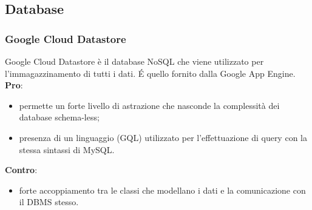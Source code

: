 	\subsection{Database} %
	\label{sub:database}

		\subsubsection{Google Cloud Datastore} %
		\label{ssub:datastore}
		Google Cloud Datastore è il database NoSQL che viene utilizzato per l'immagazzinamento di tutti i dati. \'E quello fornito dalla Google App Engine. \newline
		\textbf{Pro}:
			\begin{itemize}
				\item permette un forte livello di astrazione che nasconde la complessità dei database schema-less;
				\item presenza di un linguaggio (GQL) utilizzato per l'effettuazione di query con la stessa sintassi di MySQL.
			\end{itemize}
			\noindent
			\textbf{Contro}:
				\begin{itemize}
					\item forte accoppiamento tra le classi che modellano i dati e la comunicazione con il DBMS stesso.
				\end{itemize}
			\noindent


